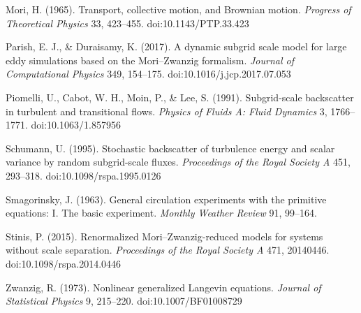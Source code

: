 \documentclass[11pt]{article}
\begin{document}
Mori, H. (1965). Transport, collective motion, and Brownian motion. \emph{Progress of Theoretical Physics} 33, 423–455. doi:10.1143/PTP.33.423


Parish, E. J., \& Duraisamy, K. (2017). A dynamic subgrid scale model for large eddy simulations based on the Mori–Zwanzig formalism. \emph{Journal of Computational Physics} 349, 154–175. doi:10.1016/j.jcp.2017.07.053


Piomelli, U., Cabot, W. H., Moin, P., \& Lee, S. (1991). Subgrid-scale backscatter in turbulent and transitional flows. \emph{Physics of Fluids A: Fluid Dynamics} 3, 1766–1771. doi:10.1063/1.857956


Schumann, U. (1995). Stochastic backscatter of turbulence energy and scalar variance by random subgrid-scale fluxes. \emph{Proceedings of the Royal Society A} 451, 293–318. doi:10.1098/rspa.1995.0126


Smagorinsky, J. (1963). General circulation experiments with the primitive equations: I. The basic experiment. \emph{Monthly Weather Review} 91, 99–164.


Stinis, P. (2015). Renormalized Mori–Zwanzig-reduced models for systems without scale separation. \emph{Proceedings of the Royal Society A} 471, 20140446. doi:10.1098/rspa.2014.0446


Zwanzig, R. (1973). Nonlinear generalized Langevin equations. \emph{Journal of Statistical Physics} 9, 215–220. doi:10.1007/BF01008729
\end{document}
